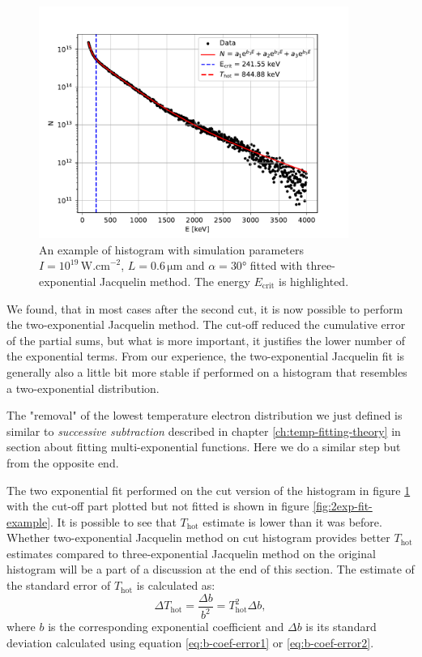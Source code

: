 \begin{figure}[t]
	\centering
	\includegraphics[width=0.9\textwidth]{figures/hist_1e19_060_30_3exp}
	\caption{An example of histogram with simulation parameters $I=10^{19}\,\mathrm{W.cm}^{-2}$, $L=0.6\,\mathrm{\mu m}$ and $\alpha = 30$° fitted with three-exponential Jacquelin method. The energy $E_{\mathrm{crit}}$ is highlighted.}
	\label{fig:3exp-fit-cut-example}
\end{figure}

We found, that in most cases after the second cut, it is now possible to perform the two-exponential Jacquelin method. The cut-off reduced the cumulative error of the partial sums, but what is more important, it justifies the lower number of the exponential terms. From our experience, the two-exponential Jacquelin fit is generally also a little bit more stable if performed on a histogram that resembles a two-exponential distribution. 

The "removal" of the lowest temperature electron distribution we just defined is similar to \textit{successive subtraction} described in chapter \ref{ch:temp-fitting-theory} in section about fitting multi-exponential functions. Here we do a similar step but from the opposite end.

The two exponential fit performed on the cut version of the histogram in figure \ref{fig:3exp-fit-cut-example} with the cut-off part plotted but not fitted is shown in figure \ref{fig:2exp-fit-example}. It is possible to see that $T_{\mathrm{hot}}$ estimate is lower than it was before. Whether two-exponential Jacquelin method on cut histogram provides better $T_{\mathrm{hot}}$ estimates compared to three-exponential Jacquelin method on the original histogram will be a part of a discussion at the end of this section. The estimate of the standard error of $T_{\mathrm{hot}}$ is calculated as:
\begin{equation}
	\label{eq:t-hot-error}
	\Delta T_\mathrm{hot} = \frac{\Delta b}{b^2} = T_\mathrm{hot}^2\Delta b,
\end{equation}
where $b$ is the corresponding exponential coefficient and $\Delta b$ is its standard deviation calculated using equation \ref{eq:b-coef-error1} or \ref{eq:b-coef-error2}.

